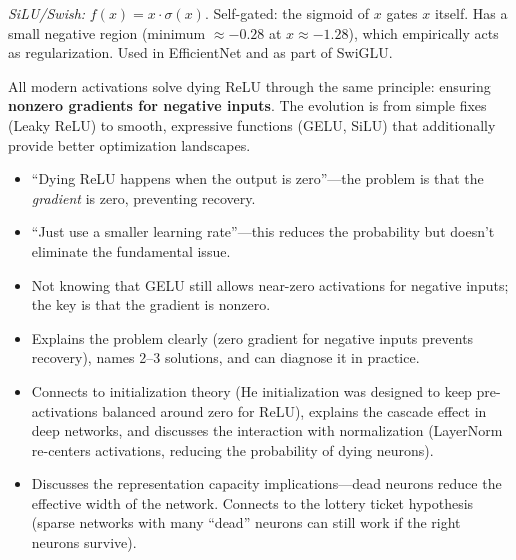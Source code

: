 \begin{interviewq}
\textit{SiLU/Swish:} $f(x) = x \cdot \sigma(x)$. Self-gated: the sigmoid of $x$ gates $x$ itself. Has a small negative region (minimum $\approx -0.28$ at $x \approx -1.28$), which empirically acts as regularization. Used in EfficientNet and as part of SwiGLU.

All modern activations solve dying ReLU through the same principle: ensuring \textbf{nonzero gradients for negative inputs}. The evolution is from simple fixes (Leaky ReLU) to smooth, expressive functions (GELU, SiLU) that additionally provide better optimization landscapes.

\redflags
\begin{itemize}
    \item ``Dying ReLU happens when the output is zero''---the problem is that the \textit{gradient} is zero, preventing recovery.
    \item ``Just use a smaller learning rate''---this reduces the probability but doesn't eliminate the fundamental issue.
    \item Not knowing that GELU still allows near-zero activations for negative inputs; the key is that the gradient is nonzero.
\end{itemize}


\goodgreat
\begin{itemize}
    \item {} Explains the problem clearly (zero gradient for negative inputs prevents recovery), names 2--3 solutions, and can diagnose it in practice.
    \item {} Connects to initialization theory (He initialization was designed to keep pre-activations balanced around zero for ReLU), explains the cascade effect in deep networks, and discusses the interaction with normalization (LayerNorm re-centers activations, reducing the probability of dying neurons).
    \item {} Discusses the representation capacity implications---dead neurons reduce the effective width of the network. Connects to the lottery ticket hypothesis (sparse networks with many ``dead'' neurons can still work if the right neurons survive).
\end{itemize}

\end{interviewq}

